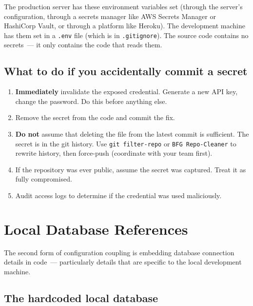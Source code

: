 \noindent{}The production server has these environment variables set (through the server's configuration, through a secrets manager like AWS Secrets Manager or HashiCorp Vault, or through a platform like Heroku). The development machine has them set in a \texttt{.env} file (which is in \texttt{.gitignore}). The source code contains no secrets~--- it only contains the code that reads them.

\subsection*{What to do if you accidentally commit a secret}\label{09-configuration-coupling:what-to-do-if-you-accidentally-commit-a-secret}

\begin{enumerate}
\def\labelenumi{\arabic{enumi}.}
\tightlist
\item
  \textbf{Immediately} invalidate the exposed credential. Generate a new API key, change the password. Do this before anything else.
\item
  Remove the secret from the code and commit the fix.
\item
  \textbf{Do not} assume that deleting the file from the latest commit is sufficient. The secret is in the git history. Use \texttt{git\ filter-repo} or \texttt{BFG\ Repo-Cleaner} to rewrite history, then force-push (coordinate with your team first).
\item
  If the repository was ever public, assume the secret was captured. Treat it as fully compromised.
\item
  Audit access logs to determine if the credential was used maliciously.
\end{enumerate}

\setcounter{section}{1}
\section{Local Database References}\label{09-configuration-coupling:92-local-database-references}

The second form of configuration coupling is embedding database connection details in code~--- particularly details that are specific to the local development machine.

\subsection*{The hardcoded local database}\label{09-configuration-coupling:the-hardcoded-local-database}

